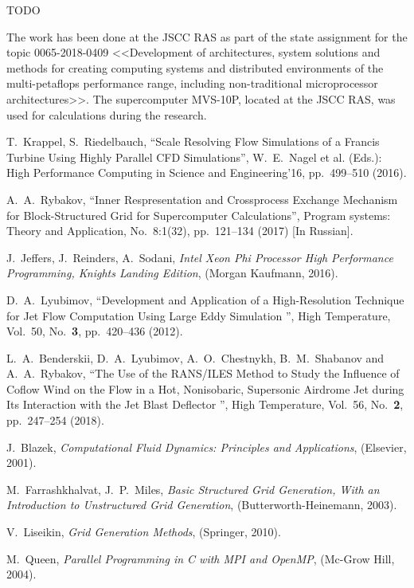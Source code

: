 \documentclass[
11pt,%
tightenlines,%
twoside,%
onecolumn,%
nofloats,%
nobibnotes,%
nofootinbib,%
superscriptaddress,%
noshowpacs,%
centertags]%
{revtex4}
\begin{document}
TODO

\begin{acknowledgments}
The work has been done at the JSCC RAS as part of the state assignment for the topic 0065-2018-0409 <<Development of architectures, system solutions and methods for creating computing systems and distributed environments of the multi-petaflops performance range, including non-traditional microprocessor architectures>>. The supercomputer MVS-10P, located at the JSCC RAS, was used for calculations during the research.
\end{acknowledgments}

\begin{thebibliography}{99}

T.~Krappel, S.~Riedelbauch, \textquotedblleft Scale Resolving Flow Simulations of a Francis Turbine Using Highly Parallel CFD Simulations\textquotedblright, W.~E.~Nagel et al. (Eds.): High Performance Computing in Science and Engineering'16, pp.~499--510 (2016).

A.~A.~Rybakov, \textquotedblleft Inner Respresentation and Crossprocess Exchange Mechanism for Block-Structured Grid for Supercomputer Calculations\textquotedblright, Program systems: Theory and Application, No.~8:1(32), pp.~121--134 (2017) [In Russian].

J.~Jeffers, J.~Reinders, A.~Sodani, \emph{Intel Xeon Phi Processor High Performance Programming, Knights Landing Edition}, (Morgan Kaufmann, 2016).

D.~A.~Lyubimov, \textquotedblleft Development and Application of a High-Resolution Technique for Jet Flow Computation Using Large Eddy Simulation \textquotedblright, High Temperature, Vol.~50, No.~\textbf{3}, pp.~420--436 (2012).

L.~A.~Benderskii, D.~A.~Lyubimov, A.~O.~Chestnykh, B.~M.~Shabanov and A.~A.~Rybakov, \textquotedblleft The Use of the RANS/ILES Method to Study the Influence of Coflow Wind on the Flow in a Hot, Nonisobaric, Supersonic Airdrome Jet during Its Interaction with the Jet Blast Deflector \textquotedblright, High Temperature, Vol.~56, No.~\textbf{2}, pp.~247--254 (2018).

J.~Blazek, \emph{Computational Fluid Dynamics: Principles and Applications}, (Elsevier, 2001).

M.~Farrashkhalvat, J.~P.~Miles, \emph{Basic Structured Grid Generation, With an Introduction to Unstructured Grid Generation}, (Butterworth-Heinemann, 2003).

V.~Liseikin, \emph{Grid Generation Methods}, (Springer, 2010).

M.~Queen, \emph{Parallel Programming in C with MPI and OpenMP}, (Mc-Grow Hill, 2004).

\end{thebibliography}
\end{document}
